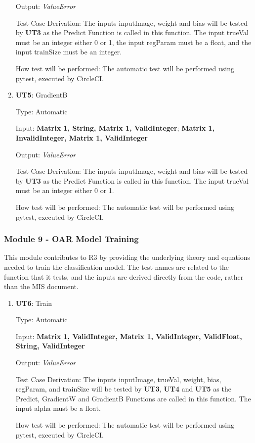 \documentclass[12pt, titlepage]{article}
\begin{document}
\begin{enumerate}
Output: \textit{ValueError}

Test Case Derivation: The inputs inputImage, weight and bias will be tested by \textbf{UT3} as the Predict Function is called in this function. 
The input trueVal must be an integer either 0 or 1, the input regParam must be a float, and the input trainSize must be an integer.

How test will be performed: The automatic test will be performed using pytest, executed by CircleCI.

\item{\textbf{UT5}: GradientB}

Type: Automatic
					
Input: \textbf{Matrix 1, String, Matrix 1, ValidInteger}; \textbf{Matrix 1, InvalidInteger, Matrix 1, ValidInteger}
					
Output: \textit{ValueError}

Test Case Derivation: The inputs inputImage, weight and bias will be tested by \textbf{UT3} as the Predict Function is called in this function. 
The input trueVal must be an integer either 0 or 1.

How test will be performed: The automatic test will be performed using pytest, executed by CircleCI.
\end{enumerate}

\subsubsection{Module 9 - OAR Model Training}
This module contributes to R3 by providing the underlying theory and equations needed to train the classification model.
The test names are related to the function that it tests, and the inputs are derived directly from the code, rather than the MIS document.

\begin{enumerate}

  \item{\textbf{UT6}: Train}

  Type: Automatic
            
  Input: \textbf{Matrix 1, ValidInteger, Matrix 1, ValidInteger, ValidFloat, String, ValidInteger}
            
  Output: \textit{ValueError}
  
  Test Case Derivation: The inputs inputImage, trueVal, weight, bias, regParam, and trainSize will be tested by \textbf{UT3}, \textbf{UT4} and \textbf{UT5} as the Predict, GradientW and GradientB Functions are called in this function. 
  The input alpha must be a float.
  
  How test will be performed: The automatic test will be performed using pytest, executed by CircleCI.

\end{enumerate}
\end{document}
